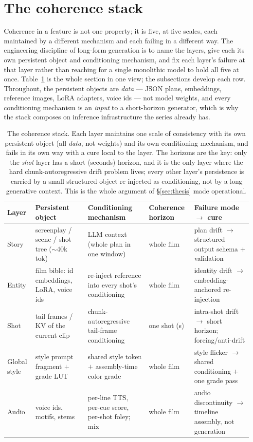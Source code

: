 \documentclass[11pt]{article}
\begin{document}
\section{The coherence stack}
\label{sec:stack}

Coherence in a feature is not one property; it is five, at five scales, each maintained by a different mechanism
and each failing in a different way. The engineering discipline of long-form generation is to name the layers,
give each its own persistent object and conditioning mechanism, and fix each layer's failure at that layer rather
than reaching for a single monolithic model to hold all five at once. Table~\ref{tab:stack} is the whole section
in one view; the subsections develop each row. Throughout, the persistent objects are \emph{data} --- JSON plans,
embeddings, reference images, LoRA adapters, voice ids --- not model weights, and every conditioning mechanism is
an \emph{input} to a short-horizon generator, which is why the stack composes on inference infrastructure the
series already has.

\begin{table}[t]
\centering
\small
\setlength{\tabcolsep}{4.5pt}
\begin{tabular}{@{}p{1.9cm}p{2.7cm}p{3.0cm}p{1.7cm}p{3.2cm}@{}}
\toprule
\textbf{Layer} & \textbf{Persistent object} & \textbf{Conditioning mechanism} & \textbf{Coherence horizon} & \textbf{Failure mode $\rightarrow$ cure} \\
\midrule
Story & screenplay / scene / shot tree ($\sim$40k tok) & LLM context (whole plan in one window) & whole film & plan drift $\rightarrow$ structured-output schema $+$ validation \\
Entity & film bible: id embeddings, LoRA, voice ids & re-inject reference into every shot's conditioning & whole film & identity drift $\rightarrow$ embedding-anchored re-injection \\
Shot & tail frames / KV of the current clip & chunk-autoregressive tail-frame conditioning & one shot (s) & intra-shot drift $\rightarrow$ short horizon; forcing/anti-drift \\
Global style & style prompt fragment $+$ grade LUT & shared style token $+$ assembly-time color grade & whole film & style flicker $\rightarrow$ shared conditioning $+$ one grade pass \\
Audio & voice ids, motifs, stems & per-line TTS, per-cue score, per-shot foley; mix & whole film & audio discontinuity $\rightarrow$ timeline assembly, not generation \\
\bottomrule
\end{tabular}
\caption{The coherence stack. Each layer maintains one scale of consistency with its own persistent object
(all \emph{data}, not weights) and its own conditioning mechanism, and fails in its own way with a cure local to
the layer. The horizons are the key: only the \emph{shot} layer has a short (seconds) horizon, and it is the only
layer where the hard chunk-autoregressive drift problem lives; every other layer's persistence is carried by a
small structured object re-injected as conditioning, not by a long generative context. This is the whole
argument of \S\ref{sec:thesis} made operational.}
\label{tab:stack}
\end{table}
\end{document}
